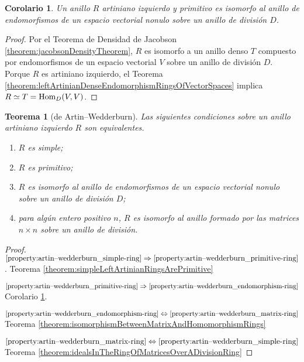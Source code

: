 \documentclass{report}
\newcommand{\Hom}{\textnormal{Hom}}
\newtheorem{theorem}{Teorema}
\newtheorem{corollary}{Corolario}
\begin{document}
  \begin{corollary}
    \label{corollary:leftArtinianPrimitiveRingsAreRingsOfEndomorphisms}
    Un anillo \(R\) artiniano izquierdo y primitivo es isomorfo al anillo de endomorfismos de un espacio vectorial nonulo sobre un anillo de división \(D\).
  \end{corollary}
  \begin{proof}
    Por el Teorema de Densidad de Jacobson \ref{theorem:jacobsonDensityTheorem}, \(R\) es isomorfo a un anillo denso \(T\) compuesto por endomorfismos de un espacio vectorial \(V\) sobre un anillo de división \(D\).
    Porque \(R\) es artiniano izquierdo, el Teorema \ref{theorem:leftArtinianDenseEndomorphismRingsOfVectorSpaces} implica \(R \simeq T = \Hom _D(V, V)\).
  \end{proof}

  \begin{theorem}[de Artin--Wedderburn]
    Las siguientes condiciones sobre un anillo artiniano izquierdo \(R\) son equivalentes.
    \begin{enumerate}
      \item
        \label{property:artin--wedderburn_simple-ring}
        \(R\) es simple;
      \item
        \label{property:artin--wedderburn_primitive-ring}
        \(R\) es primitivo;
      \item
        \label{property:artin--wedderburn_endomorphism-ring}
        \(R\) es isomorfo al anillo de endomorfismos de un espacio vectorial nonulo sobre un anillo de división \(D\);
      \item
        \label{property:artin--wedderburn_matrix-ring}
        para algún entero positivo \(n\), \(R\) es isomorfo al anillo formado por las matrices \(n \times n\) sobre un anillo de división.
    \end{enumerate}
  \end{theorem}
  \begin{proof}
    \(\ref{property:artin--wedderburn_simple-ring} \Rightarrow \ref{property:artin--wedderburn_primitive-ring}\).
    Teorema \ref{theorem:simpleLeftArtinianRingsArePrimitive}

    \(\ref{property:artin--wedderburn_primitive-ring} \Rightarrow \ref{property:artin--wedderburn_endomorphism-ring}\)
    Corolario \ref{corollary:leftArtinianPrimitiveRingsAreRingsOfEndomorphisms}.

    \(\ref{property:artin--wedderburn_endomorphism-ring} \Leftrightarrow \ref{property:artin--wedderburn_matrix-ring}\)
    Teorema \ref{theorem:isomorphismBetweenMatrixAndHomomorphismRings}

    \(\ref{property:artin--wedderburn_matrix-ring} \Leftrightarrow \ref{property:artin--wedderburn_simple-ring}\)
    Teorema \ref{theorem:idealsInTheRingOfMatricesOverADivisionRing}
  \end{proof}
\end{document}
